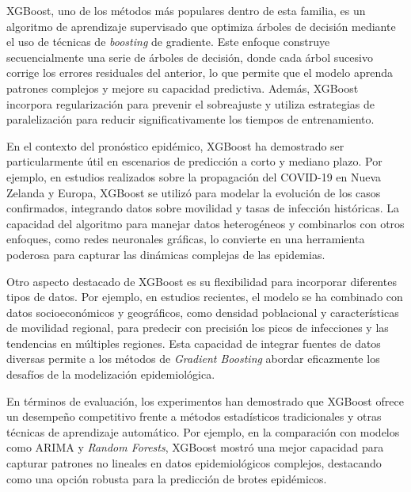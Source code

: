 XGBoost, uno de los métodos más populares dentro de esta familia, es un algoritmo de aprendizaje supervisado que optimiza árboles de decisión mediante el uso de técnicas de \textit{boosting} de gradiente. Este enfoque construye secuencialmente una serie de árboles de decisión, donde cada árbol sucesivo corrige los errores residuales del anterior, lo que permite que el modelo aprenda patrones complejos y mejore su capacidad predictiva\parencite{Nguyen2023NZSTGNN, Stergiou2022MachineLearning}. Además, XGBoost incorpora regularización para prevenir el sobreajuste y utiliza estrategias de paralelización para reducir significativamente los tiempos de entrenamiento\parencite{Stergiou2022MachineLearning}.

En el contexto del pronóstico epidémico, XGBoost ha demostrado ser particularmente útil en escenarios de predicción a corto y mediano plazo. Por ejemplo, en estudios realizados sobre la propagación del COVID-19 en Nueva Zelanda y Europa, XGBoost se utilizó para modelar la evolución de los casos confirmados, integrando datos sobre movilidad y tasas de infección históricas\parencite{Nguyen2023NZSTGNN, Baccega2024Sybil}. La capacidad del algoritmo para manejar datos heterogéneos y combinarlos con otros enfoques, como redes neuronales gráficas, lo convierte en una herramienta poderosa para capturar las dinámicas complejas de las epidemias\parencite{Rodriguez2022DataCentric}.

Otro aspecto destacado de XGBoost es su flexibilidad para incorporar diferentes tipos de datos. Por ejemplo, en estudios recientes, el modelo se ha combinado con datos socioeconómicos y geográficos, como densidad poblacional y características de movilidad regional, para predecir con precisión los picos de infecciones y las tendencias en múltiples regiones\parencite{Nguyen2023NZSTGNN, Baccega2024Sybil}. Esta capacidad de integrar fuentes de datos diversas permite a los métodos de \textit{Gradient Boosting} abordar eficazmente los desafíos de la modelización epidemiológica\parencite{Stergiou2022MachineLearning, Rodriguez2022DataCentric}.

En términos de evaluación, los experimentos han demostrado que XGBoost ofrece un desempeño competitivo frente a métodos estadísticos tradicionales y otras técnicas de aprendizaje automático. Por ejemplo, en la comparación con modelos como ARIMA y \textit{Random Forests}, XGBoost mostró una mejor capacidad para capturar patrones no lineales en datos epidemiológicos complejos, destacando como una opción robusta para la predicción de brotes epidémicos\parencite{Nguyen2023NZSTGNN, Baccega2024Sybil, Rodriguez2022DataCentric}.

